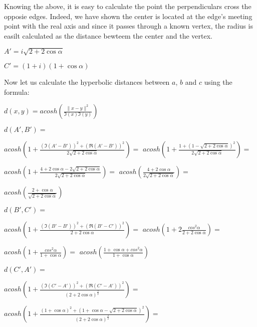 \documentclass[a4paper,10pt]{article}
\begin{document}
Knowing the above, it is easy to calculate the point the perpendiculars cross
the opposie edges. Indeed, we have shown the center is located at the edge's
meeting point with the real axis and since it passes through a known vertex, 
the radius is easilt calculated as the distance bewteem the center and the
vertex.

\begin{center}
$A' = i \sqrt{2 + 2 \cos{\alpha}}$

$C' = \left(1 + i\right) \left(1 + \cos{\alpha}\right)$
\end{center}

Now let us calculate the hyperbolic distances between $a$, $b$ and $c$ using the formula:

\begin{center}
$d\left(x,y\right) = acosh(\frac{\|x-y\|^{2}}{\Im\left(x\right)\Im\left(y\right)})$
\end{center}

\noindent$d\left(A', B'\right) =$

$acosh\left(1 + \frac{\left(\Im\left(A' - B'\right)\right)^{2} + \left(\Re\left(A' - B'\right)\right)^{2}}{2 \sqrt{2 + 2 \cos{\alpha}}}\right) =$
$acosh\left(1 + \frac{1 + \left(1 - \sqrt{2 + 2 \cos{\alpha}}\right)^{2}}{2 \sqrt{2 + 2 \cos{\alpha}}}\right) =$

$acosh\left(1 + \frac{4 + 2 \cos{\alpha} - 2 \sqrt{2 + 2 \cos{\alpha}}}{2 \sqrt{2 + 2 \cos{\alpha}}}\right) =$
$acosh\left(\frac{4 + 2 \cos{\alpha}}{2 \sqrt{2 + 2 \cos{\alpha}}}\right) =$

$acosh\left(\frac{2 + \cos{\alpha}}{\sqrt{2 + 2 \cos{\alpha}}}\right) $

\noindent$d\left(B', C'\right) = $

$acosh\left(1 + \frac{\left(\Im\left(B' - B'\right)\right)^{2} + \left(\Re\left(B' - C'\right)\right)^{2}}{2 + 2 \cos{\alpha}}\right) =$
$acosh\left(1 + 2 \frac{cos^{2}{\alpha}}{2 + 2 \cos{\alpha}}\right) =$

$acosh\left(1 + \frac{cos^{2}{\alpha}}{1 + \cos{\alpha}}\right) =$
$acosh\left(\frac{1 + \cos{\alpha} + cos^{2}{\alpha}}{1 + \cos{\alpha}}\right) $

\noindent$ d\left(C', A'\right)=$

$acosh\left(1 + \frac{\left(\Im\left(C' - A'\right)\right)^{2} + \left(\Re\left(C' - A'\right)\right)^{2}}{\left(2 + 2 \cos{\alpha}\right)^{\frac{3}{2}}}\right) =$

$acosh\left(1 + \frac{\left(1 + \cos{\alpha}\right)^{2} + \left(1 + \cos{\alpha} - \sqrt{2 + 2 \cos{\alpha}}\right)^{2}}{\left(2 + 2 \cos{\alpha}\right)^{\frac{3}{2}}}\right) =$
\end{document}
